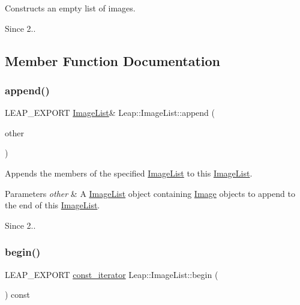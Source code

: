 Constructs an empty list of images. \begin{DoxySince}{Since}
2.. 
\end{DoxySince}


\subsection{Member Function Documentation}
\mbox{\label{class_leap_1_1_image_list_abb73a8ec8bf55019accfd092029e4513}} 
\subsubsection{\texorpdfstring{append()}{append()}}
{\footnotesize\ttfamily L\+E\+A\+P\+\_\+\+E\+X\+P\+O\+RT \hyperlink{class_leap_1_1_image_list}{Image\+List}\& Leap\+::\+Image\+List\+::append (\begin{DoxyParamCaption}\item[{const \hyperlink{class_leap_1_1_image_list}{Image\+List} \&}]{other }\end{DoxyParamCaption})}

Appends the members of the specified \hyperlink{class_leap_1_1_image_list}{Image\+List} to this \hyperlink{class_leap_1_1_image_list}{Image\+List}. 
\begin{DoxyParams}{Parameters}
{\em other} & A \hyperlink{class_leap_1_1_image_list}{Image\+List} object containing \hyperlink{class_leap_1_1_image}{Image} objects to append to the end of this \hyperlink{class_leap_1_1_image_list}{Image\+List}. \\
\hline
\end{DoxyParams}
\begin{DoxySince}{Since}
2.. 
\end{DoxySince}
\mbox{\label{class_leap_1_1_image_list_a2cb2ff33ca9f5adbb33adc9064decf34}} 
\subsubsection{\texorpdfstring{begin()}{begin()}}
{\footnotesize\ttfamily L\+E\+A\+P\+\_\+\+E\+X\+P\+O\+RT \hyperlink{class_leap_1_1_image_list_ae3c17a6b8ac23853649ba93abd5a1dbe}{const\+\_\+iterator} Leap\+::\+Image\+List\+::begin (\begin{DoxyParamCaption}{ }\end{DoxyParamCaption}) const}

